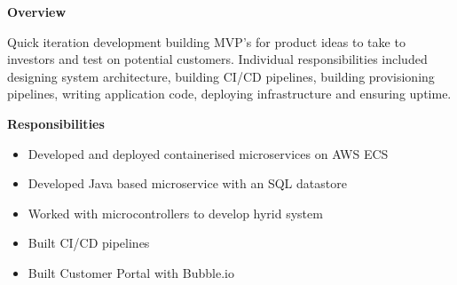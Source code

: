 \documentclass[10pt,a4paper]{altacv}
\begin{document}
\textbf{Overview}

Quick iteration development building MVP's for product ideas to take to investors and test on potential customers. Individual responsibilities included designing system architecture, building CI/CD pipelines, building provisioning pipelines, writing application code, deploying infrastructure and ensuring uptime. 
\divider

\textbf{Responsibilities}
\begin{itemize}
  \item Developed and deployed containerised microservices on AWS ECS
  \item Developed Java based microservice with an SQL datastore
  \item Worked with microcontrollers to develop hyrid system
  \item Built CI/CD pipelines
  \item Built Customer Portal with Bubble.io
\end{itemize}
\end{document}
